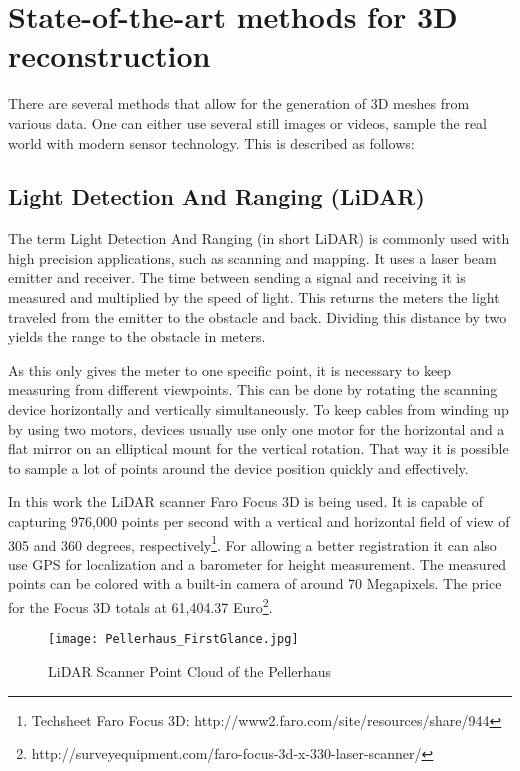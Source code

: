 \section{State-of-the-art methods for 3D reconstruction}

There are several methods that allow for the generation of 3D meshes from various data. One can either use several still images or videos, sample the real world with modern sensor technology. This is described as follows:

\subsection{Light Detection And Ranging (LiDAR)}

The term Light Detection And Ranging (in short LiDAR) is commonly used with high precision applications, such as scanning and mapping. It uses a laser beam emitter and receiver. The time between sending a signal and receiving it is measured and multiplied by the speed of light. This returns the meters the light traveled from the emitter to the obstacle and back. Dividing this distance by two yields the range to the obstacle in meters.\parencite[see][p8-9]{dp_lidar}

As this only gives the meter to one specific point, it is necessary to keep measuring from different viewpoints. This can be done by rotating the scanning device horizontally and vertically simultaneously. To keep cables from winding up by using two motors, devices usually use only one motor for the horizontal and a flat mirror on an elliptical mount for the vertical rotation. That way it is possible to sample a lot of points around the device position quickly and effectively.

In this work the LiDAR scanner Faro Focus 3D is being used. It is capable of capturing 976,000 points per second with a vertical and horizontal field of view of 305 and 360 degrees, respectively\footnote{Techsheet Faro Focus 3D: http://www2.faro.com/site/resources/share/944}. For allowing a better registration it can also use GPS for localization and a barometer for height measurement. The measured points can be colored with a built-in camera of around 70 Megapixels. The price for the Focus 3D totals at 61,404.37 Euro\footnote{http://surveyequipment.com/faro-focus-3d-x-330-laser-scanner/}.

\begin{figure}[h]
	\centering
	\texttt{[image: Pellerhaus\_FirstGlance.jpg]}
	\caption{LiDAR Scanner Point Cloud of the Pellerhaus}
	\label{fig:LiDAR_PointCloud}
\end{figure}

